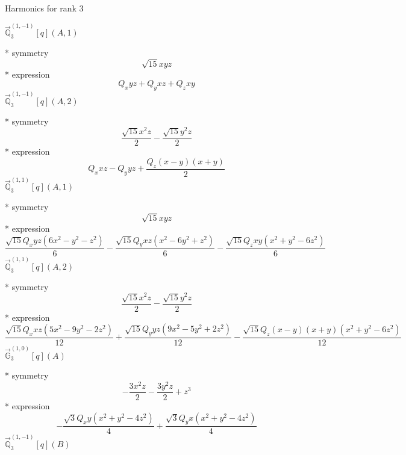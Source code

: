 \documentclass[fleqn,8pt]{jsarticle}
\begin{document}
\noindent * Harmonics for rank 3

\noindent\quad $\vec{\mathbb{Q}}_{3}^{(1,-1)}[q](A,1)$

\noindent\quad ** symmetry
\begin{dmath*}
\sqrt{15} x y z
\end{dmath*}
\noindent\quad ** expression
\begin{dmath*}
Q_{x} y z + Q_{y} x z + Q_{z} x y
\end{dmath*}
\noindent\quad $\vec{\mathbb{Q}}_{3}^{(1,-1)}[q](A,2)$

\noindent\quad ** symmetry
\begin{dmath*}
\frac{\sqrt{15} x^{2} z}{2} - \frac{\sqrt{15} y^{2} z}{2}
\end{dmath*}
\noindent\quad ** expression
\begin{dmath*}
Q_{x} x z - Q_{y} y z + \frac{Q_{z} \left(x - y\right) \left(x + y\right)}{2}
\end{dmath*}
\noindent\quad $\vec{\mathbb{Q}}_{3}^{(1,1)}[q](A,1)$

\noindent\quad ** symmetry
\begin{dmath*}
\sqrt{15} x y z
\end{dmath*}
\noindent\quad ** expression
\begin{dmath*}
\frac{\sqrt{15} Q_{x} y z \left(6 x^{2} - y^{2} - z^{2}\right)}{6} - \frac{\sqrt{15} Q_{y} x z \left(x^{2} - 6 y^{2} + z^{2}\right)}{6} - \frac{\sqrt{15} Q_{z} x y \left(x^{2} + y^{2} - 6 z^{2}\right)}{6}
\end{dmath*}
\noindent\quad $\vec{\mathbb{Q}}_{3}^{(1,1)}[q](A,2)$

\noindent\quad ** symmetry
\begin{dmath*}
\frac{\sqrt{15} x^{2} z}{2} - \frac{\sqrt{15} y^{2} z}{2}
\end{dmath*}
\noindent\quad ** expression
\begin{dmath*}
\frac{\sqrt{15} Q_{x} x z \left(5 x^{2} - 9 y^{2} - 2 z^{2}\right)}{12} + \frac{\sqrt{15} Q_{y} y z \left(9 x^{2} - 5 y^{2} + 2 z^{2}\right)}{12} - \frac{\sqrt{15} Q_{z} \left(x - y\right) \left(x + y\right) \left(x^{2} + y^{2} - 6 z^{2}\right)}{12}
\end{dmath*}
\noindent\quad $\vec{\mathbb{G}}_{3}^{(1,0)}[q](A)$

\noindent\quad ** symmetry
\begin{dmath*}
- \frac{3 x^{2} z}{2} - \frac{3 y^{2} z}{2} + z^{3}
\end{dmath*}
\noindent\quad ** expression
\begin{dmath*}
- \frac{\sqrt{3} Q_{x} y \left(x^{2} + y^{2} - 4 z^{2}\right)}{4} + \frac{\sqrt{3} Q_{y} x \left(x^{2} + y^{2} - 4 z^{2}\right)}{4}
\end{dmath*}
\noindent\quad $\vec{\mathbb{Q}}_{3}^{(1,-1)}[q](B)$
\end{document}

